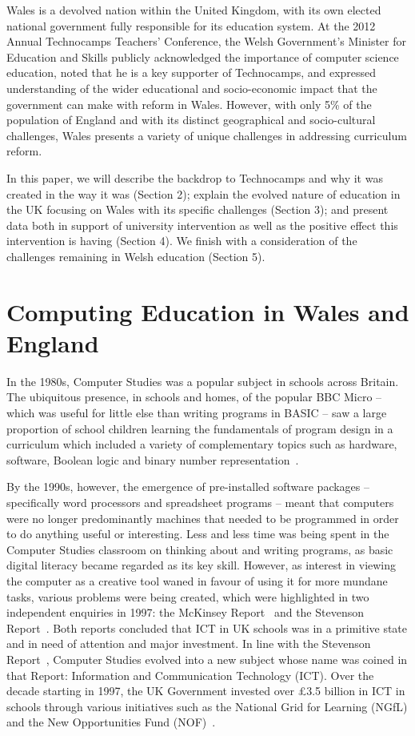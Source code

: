 \documentclass{sig-alternate}
\begin{document}
Wales is a devolved nation within the United Kingdom, with its own
elected national government fully responsible for its education system.
At the 2012 Annual Technocamps Teachers' Conference,
the Welsh Government's Minister for Education and Skills
publicly acknowledged the importance of computer science education,
noted that he is a key supporter of Technocamps,
and expressed understanding of the wider educational and
socio-economic impact that the government can make with reform in Wales.
However, with only 5\% of the population of England and with its distinct
geographical and socio-cultural challenges, Wales presents
a variety of unique challenges in addressing curriculum reform.

In this paper, we will describe
the backdrop to Technocamps and why it was created in the way it was
(Section 2);
explain the evolved nature of education
in the UK focusing on Wales with its specific
challenges (Section 3);
and present data both in support of
university intervention as well as
the positive effect this intervention is having (Section 4).
We finish with a consideration of the challenges remaining
in Welsh education (Section 5).

\section{Computing Education in Wales and England}

In the 1980s, Computer Studies was a popular subject
in schools across Britain. The ubiquitous presence, in schools and homes,
of the popular BBC Micro -- which was useful for little else than
writing programs in BASIC -- saw a large proportion
of school children learning the fundamentals of program design
in a curriculum which included a variety of complementary
topics such as hardware, software, Boolean logic
and binary number representation~\cite{Doyle:1988}.

By the 1990s, however, the emergence of pre-installed software packages
-- specifically word processors and spreadsheet programs -- meant
that computers were no longer predominantly machines that
needed to be programmed in order to do anything useful or interesting.
Less and less time was being spent in the Computer Studies
classroom on thinking about and writing programs,
as basic digital literacy became regarded as its key skill.
However, as interest in viewing the computer as a creative tool
waned in favour of using it for more mundane tasks,
various problems were being created, which were highlighted in
two independent enquiries in 1997: the McKinsey Report~\cite{McKinsey:1997}
and the Stevenson Report~\cite{Stevenson:1997}.
Both reports concluded that ICT in UK schools was in a primitive state
and in need of attention and major investment.
In line with the Stevenson Report~\cite{Stevenson:1997},
Computer Studies evolved into
a new subject whose name was coined in that Report:
Information and Communication Technology (ICT).
Over the decade starting in 1997, the UK Government invested
over \pounds3.5 billion in ICT in schools through various initiatives
such as the National Grid for Learning (NGfL)
and the New Opportunities Fund (NOF)~\cite{Doughty:2006}.
\end{document}
